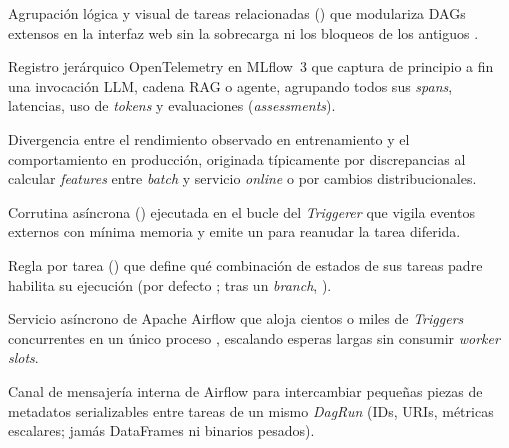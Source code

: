 {\begin{description}[style=standard, itemsep=2pt, parsep=0pt, topsep=4pt, leftmargin=1.1em, font=\sffamily\bfseries\color{PrimaryDark}]
\item[TaskGroup.]
Agrupación lógica y visual de tareas relacionadas () que modulariza DAGs extensos en la interfaz web sin la sobrecarga ni los bloqueos de los antiguos .

\item[Trace (Traza).]
Registro jerárquico OpenTelemetry en MLflow~3 que captura de principio a fin una invocación LLM, cadena RAG o agente, agrupando todos sus \textit{spans}, latencias, uso de \textit{tokens} y evaluaciones (\textit{assessments}).

\item[Training-Serving Skew.]
Divergencia entre el rendimiento observado en entrenamiento y el comportamiento en producción, originada típicamente por discrepancias al calcular \textit{features} entre \textit{batch} y servicio \textit{online} o por cambios distribucionales.

\item[Trigger (Airflow).]
Corrutina asíncrona () ejecutada en el bucle  del \textit{Triggerer} que vigila eventos externos con mínima memoria y emite un  para reanudar la tarea diferida.

\item[Trigger Rule.]
Regla por tarea () que define qué combinación de estados de sus tareas padre habilita su ejecución (por defecto ; tras un \textit{branch}, ).

\item[Triggerer.]
Servicio asíncrono de Apache Airflow que aloja cientos o miles de \textit{Triggers} concurrentes en un único proceso , escalando esperas largas sin consumir \textit{worker slots}.

\item[XCom (Cross-Communication).]
Canal de mensajería interna de Airflow para intercambiar pequeñas piezas de metadatos serializables entre tareas de un mismo \textit{DagRun} (IDs, URIs, métricas escalares; jamás DataFrames ni binarios pesados).

\end{description}
}
